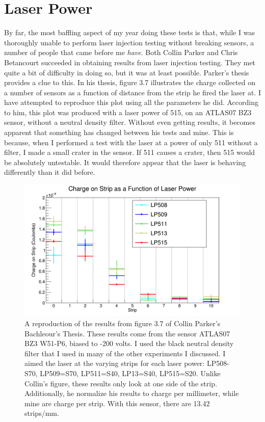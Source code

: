\documentclass{report}
\begin{document}
        \section{Laser Power} \label{sect:laser_power}
            By far, the most baffling aspect of my year doing these tests is that, while I was thoroughly unable to perform laser injection testing without breaking sensors, a number of people that came before me \textit{have}. Both Collin Parker and Chris Betancourt succeeded in obtaining results from laser injection testing. They met quite a bit of difficulty in doing so, but it was at least possible. Parker's thesis provides a clue to this. In his thesis, figure 3.7 illustrates the charge collected on a number of sensors as a function of distance from the strip he fired the laser at. I have attempted to reproduce this plot using all the parameters he did. According to him, this plot was produced with a laser power of 515, on an ATLAS07 BZ3 sensor, without a neutral density filter. Without even getting results, it becomes apparent that something has changed between his tests and mine. This is because, when I performed a test with the laser at a power of only 511 without a filter, I made a small crater in the sensor. If 511 causes a crater, then 515 would be absolutely untestable. It would therefore appear that the laser is behaving differently than it did before.

            \begin{figure}[h] 
                \includegraphics[height=.4\textheight]{charge_collection}
                \centering
                \caption{ A reproduction of the results from figure 3.7 of Collin Parker's Bachleour's Thesis. These results come from the sensor ATLAS07 BZ3 W51-P6, biased to -200 volts. I used the black neutral density filter that I used in many of the other experiments I discussed. I aimed the laser at the varying strips for each laser power: LP508-S70, LP509=S70, LP511=S40, LP13=S40, LP515=S20. Unlike Collin's figure, these results only look at one side of the strip. Additionally, he normalize his results to charge per millimeter, while mine are charge per strip. With this sensor, there are 13.42 strips/mm.}
                \label{fig:charge_collection}
            \end{figure}
\end{document}
